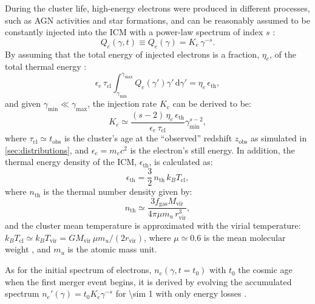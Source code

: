 \documentclass[modern]{aastex62}
\newcommand{\R}[1]{\mathrm{#1}}
\newcommand{\D}[1]{\R{d} #1}
\begin{document}
During the cluster life, high-energy electrons were produced in
different processes, such as AGN activities and star formations,
and can be reasonably assumed to be constantly injected into the
ICM with a power-law spectrum of index $s$ \citep{sarazin1999}:
\begin{equation}
  \label{eq:electron-inj}
  Q_e(\gamma, t) \equiv Q_e(\gamma) = K_e \,\gamma^{-s}.
\end{equation}
By assuming that the total energy of injected electrons is a fraction,
$\eta_e$, of the total thermal energy \citep{cassano2005}:
\begin{equation}
  \epsilon_e \,\tau_{\R{cl}} \int_{\gamma_{\R{min}}}^{\gamma_{\R{max}}}
  Q_e(\gamma') \gamma' \,\D{\gamma'}
  = \eta_e \,\epsilon_{\R{th}},
\end{equation}
and given $\gamma_{\R{min}} \ll \gamma_{\R{\max}}$,
the injection rate $K_e$ can be derived to be:
\begin{equation}
  \label{eq:injrate}
  K_e \simeq \frac{(s-2)\,\eta_e\,\epsilon_{\R{th}}}{\epsilon_e\,\tau_{\R{cl}}}
    \gamma_{\R{min}}^{s-2},
\end{equation}
where $\tau_{\R{cl}} \simeq t_{\R{obs}}$ is the cluster's age at the
\enquote{observed} redshift $z_{\R{obs}}$ as simulated in \autoref{sec:distributions},
and $\epsilon_e = m_e c^2$ is the electron's still energy.
In addition, the thermal energy density of the ICM, $\epsilon_{\R{th}}$,
is calculated as:
\begin{equation}
  \label{eq:energy-density-thermal}
  \epsilon_{\R{th}} = \frac{3}{2} \,n_{\R{th}} \,k_BT_{\R{cl}},
\end{equation}
where $n_{\R{th}}$ is the thermal number density given by:
\begin{equation}
  \label{eq:number-density-thermal}
  n_{\R{th}} \simeq \frac{3 f_{\R{gas}} M_{\R{vir}}}{4\pi \mu m_u \,r^3_{\R{vir}}},
\end{equation}
and the cluster mean temperature is approximated with the virial temperature:
$k_BT_{\R{cl}} \simeq k_BT_{\R{vir}} = G M_{\R{vir}} \,\mu m_u / (2 r_{\R{vir}})$,
where $\mu \simeq 0.6$ is the mean molecular weight
\citep[e.g.,][]{ettori2013}, and $m_u$ is the atomic mass unit.

As for the initial spectrum of electrons, $n_e(\gamma, t=t_0)$ with $t_0$
the cosmic age when the first merger event begins,
it is derived by evolving the accumulated spectrum
$n_e'(\gamma) = t_0 K_e \gamma^{-s}$ for \SI{\sim 1}{\Gyr} with only energy
losses \citep[e.g.,][]{brunetti2007}.
\end{document}
